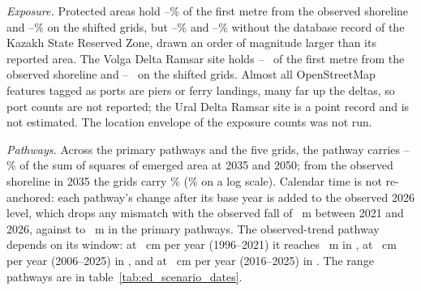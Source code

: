 \emph{Exposure.} Protected areas hold --\% of the first metre from the observed shoreline and --\% on the shifted grids, but --\% and --\% without the database record of the Kazakh State Reserved Zone, drawn an order of magnitude larger than its reported area. The Volga Delta Ramsar site holds --~\kmsq{} of the first metre from the observed shoreline and --~\kmsq{} on the shifted grids. Almost all OpenStreetMap features tagged as ports are piers or ferry landings, many far up the deltas, so port counts are not reported; the Ural Delta Ramsar site is a point record and is not estimated. The location envelope of the exposure counts was not run.

\emph{Pathways.} Across the primary pathways and the five grids, the pathway carries --\% of the sum of squares of emerged area at 2035 and 2050; from the observed shoreline in 2035 the grids carry \% (\% on a log scale). Calendar time is not re-anchored: each pathway's change after its base year is added to the observed 2026 level, which drops any mismatch with the observed fall of ~m between 2021 and 2026, against  to ~m in the primary pathways. The observed-trend pathway depends on its window: at ~cm per year (1996--2021) it reaches ~m in , at ~cm per year (2006--2025) in , and at ~cm per year (2016--2025) in . The range pathways are in table~\ref{tab:ed_scenario_dates}.
